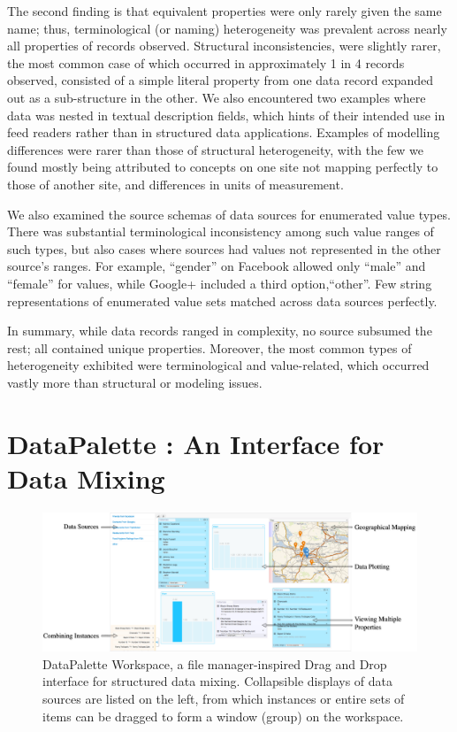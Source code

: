 \documentclass{sigchi}
\begin{document}
The second finding is that equivalent properties were only rarely given the same name; thus, terminological (or naming) heterogeneity was prevalent across nearly all properties of records observed.  Structural inconsistencies, were slightly rarer, the most common case of which occurred in approximately 1 in 4 records observed, consisted of a simple literal property from one data record expanded out as a sub-structure in the other.  We also encountered two examples where data was nested in textual description fields, which hints of their intended use in feed readers rather than in structured data applications.  Examples of modelling differences were rarer than those of structural heterogeneity, with the few we found mostly being attributed to concepts on one site not mapping perfectly to those of another site, and differences in units of measurement.

We also examined the source schemas of data sources for enumerated value types.  There was substantial terminological inconsistency among such value ranges of such types, but also cases where sources had values not represented in the other source's ranges.  For example, ``gender''  on Facebook allowed only ``male'' and ``female'' for values, while Google+ included a third option,``other''.  Few string representations of enumerated value sets matched across data sources perfectly.

In summary, while data records ranged in complexity, no source subsumed the rest; all contained unique properties.  Moreover, the most common types of heterogeneity exhibited were terminological and value-related, which occurred vastly more than structural or modeling issues.

\section{DataPalette : An Interface for Data Mixing}

\begin{figure}[tbp]
\begin{center}
\includegraphics[width=18cm]{img/screenshot}
\caption{DataPalette Workspace, a file manager-inspired Drag and Drop interface for structured data mixing. Collapsible displays of data sources are listed on the left, from which instances or entire sets of items can be dragged to form a window (group) on the workspace.}
\label{fig:workspace}
\end{center}
\end{figure}
\end{document}
